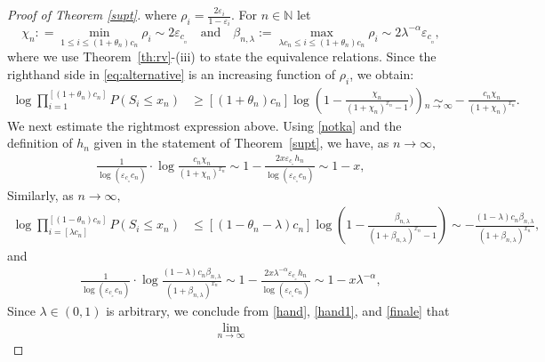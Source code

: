 \documentclass[12pt]{amsart}
\begin{document}
\begin{proof}[Proof of Theorem \ref{supt}]
where $\rho_i ={\frac {\displaystyle {2 {\varepsilon}_i}}{\displaystyle {1-{\varepsilon}_i} }}.$ For $n\in {{\mathbb N}}$ let
\begin{equation}
\label{notka}
\chi_n: = \min_{1 \leq i \leq (1+\theta_n)c_n} \rho_i \sim 2{\varepsilon}_{c_{_n}} \quad \mbox{and}
\quad \beta_{n,\lambda} := \max_{\lambda c_n\leq i \leq (1+\theta_n)c_n}
\rho_i  \sim 2 \lambda^{-\alpha}{\varepsilon}_{c_{_n}},
\end{equation}
where we use Theorem~\ref{th:rv}-(iii) to state the equivalence
relations. Since the righthand side in \eqref{eq:alternative} is an
increasing function of $\rho_i$, we obtain: \begin{eqnarray*} \log
\prod_{i=1}^{[(1+\theta_n)c_n]} P(S_i \le x_n) &\ge
{[(1+\theta_n)c_n]}\log \left( 1 -
\frac{\chi_n}{(1+\chi_n)^{x_n}-1}) \right) \underset{n\to\infty}{\sim}
-{\frac {\displaystyle {c_n\chi_n}}{\displaystyle {(1+\chi_n)^{x_n}} }}. \end{eqnarray*} We next estimate the
rightmost expression above. Using \eqref{notka} and the definition
of $h_n$ given in the statement of Theorem~\ref{supt}, we have, as
$n\to\infty,$ \begin{eqnarray*} {\frac {\displaystyle {1}}{\displaystyle {\log ({\varepsilon}_{c_{_n}}c_n)} }}\cdot \log
{\frac {\displaystyle {c_n\chi_n}}{\displaystyle {(1+\chi_n)^{x_n}} }}\sim
1-{\frac {\displaystyle {2x{\varepsilon}_{c_{_n}}h_n}}{\displaystyle {\log ({\varepsilon}_{c_{_n}}c_n)} }}\sim 1-x,
\end{eqnarray*} Similarly, as $n\to \infty,$ \begin{eqnarray*} \log \prod_{i=[\lambda
c_n]}^{[(1-\theta_n)c_n]} P(S_i \le x_n) &\le
{[(1-\theta_n-\lambda)c_n]}\log \left( 1 -
{\frac {\displaystyle {\beta_{n,\lambda}}}{\displaystyle {(1+\beta_{n,\lambda})^{x_n}-1} }} \right)
\sim - {\frac {\displaystyle {(1-\lambda)
c_n\beta_{n,\lambda}}}{\displaystyle {(1+\beta_{n,\lambda})^{x_n}} }}, \end{eqnarray*} and \begin{eqnarray*}
{\frac {\displaystyle {1}}{\displaystyle {\log ({\varepsilon}_{c_{_n}}c_n)} }}\cdot \log {\frac {\displaystyle {(1-\lambda)
c_n\beta_{n,\lambda}}}{\displaystyle {(1+\beta_{n,\lambda})^{x_n}} }} \sim
1-{\frac {\displaystyle {2x\lambda^{-\alpha}{\varepsilon}_{c_{_n}}h_n}}{\displaystyle {\log
({\varepsilon}_{c_{_n}}c_n)} }}\sim 1-x\lambda^{-\alpha}, \end{eqnarray*} Since
$\lambda\in (0,1)$ is arbitrary, we conclude from \eqref{hand},
\eqref{hand1}, and \eqref{finale} that \begin{eqnarray*} \lim_{n\to\infty}

\end{eqnarray*}
\end{proof}
\end{document}
